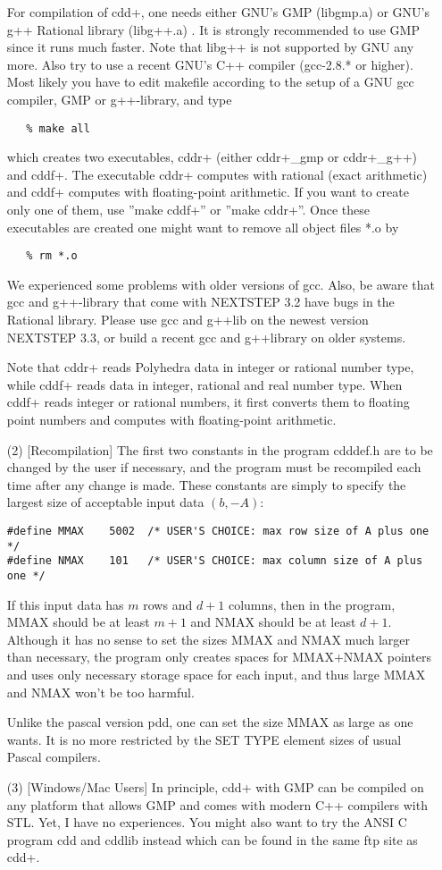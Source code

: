 \documentclass[11pt]{article}
\begin{document}
\begin{itemize}
\noindent
For compilation of cdd+, one needs either GNU's GMP (libgmp.a)  or GNU's 
g++ Rational library (libg++.a) .   It is strongly recommended to use GMP since
it runs much faster.  Note that libg++ is not supported by GNU any more.
Also try to use a recent GNU's C++ compiler (gcc-2.8.* or higher).
Most likely you have to edit makefile according to 
the setup of a GNU gcc compiler, GMP or g++-library,
 and type
\begin{verbatim}
   % make all
\end{verbatim}
which creates two executables, cddr+ (either cddr+\_gmp or cddr+\_g++)
 and cddf+.  The executable
cddr+ computes with rational (exact arithmetic) and cddf+ computes
with floating-point arithmetic.  If you want to create only one of
them, use ''make cddf+'' or ''make cddr+''.  Once these executables are 
created one might want to remove all object files *.o by
\begin{verbatim}
   % rm *.o
\end{verbatim}

We experienced some problems with older versions of gcc.    Also, be aware that
gcc and g++-library that come with NEXTSTEP 3.2 have bugs in the Rational library.
Please use gcc and g++lib on the newest version NEXTSTEP 3.3, or build a recent
gcc and g++library on older systems.

Note that cddr+ reads Polyhedra data in integer or rational
number type, while cddf+ reads data in integer, rational and real number type.
When cddf+ reads integer or rational numbers, it first converts them
to floating point numbers and computes with floating-point arithmetic.

\item[(2)] [Recompilation] The first two constants in the program cdddef.h are to be 
changed by the user if necessary, and the program must be recompiled
each time after any change is made.   These constants are simply
to specify the largest size of acceptable input data $(b, -A)$: 
\begin{verbatim}
#define MMAX    5002  /* USER'S CHOICE: max row size of A plus one */
#define NMAX    101   /* USER'S CHOICE: max column size of A plus one */
\end{verbatim}
If this input data has $m$ rows and $d+1$ columns, then in the program,
MMAX should be at least $m+1$ and NMAX should be at least
$d+1$.  Although it has no sense to set the sizes MMAX and NMAX much larger
than necessary, the program only creates spaces for MMAX+NMAX pointers
and uses only necessary storage space for each input, and
thus large MMAX and NMAX won't be too harmful.

Unlike the pascal version pdd, one can set the size MMAX as large as one
wants.  It is no more restricted by the SET TYPE element sizes of 
usual Pascal compilers.

\item[(3)] [Windows/Mac Users]  In principle, cdd+ with GMP can
be compiled on any platform that allows GMP  and comes 
with modern C++ compilers with STL.
Yet, I have no experiences.  You might also want to try
the ANSI C program cdd and cddlib
instead which can be found in the same ftp site as cdd+.
\end{itemize}
\end{document}
